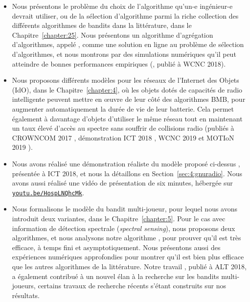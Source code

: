 \begin{resume_fr}
\begin{itemize}
    \item
    Nous présentons le problème du choix de l'algorithme qu'un-e ingénieur-e devrait utiliser, ou de la sélection d'algorithme parmi la riche collection des différents algorithmes de bandits dans la littérature, dans le Chapitre~\ref{chapter:25}.
    Nous présentons un algorithme d'agrégation d'algorithmes, appelé \Aggr, comme une solution en ligne au problème de sélection d'algorithmes, et nous montrons par des simulations numériques qu'il peut atteindre de bonnes performances empiriques
    (\cite{Besson2018WCNC}, publié à WCNC 2018).

    \item
    Nous proposons différents modèles pour les réseaux de l'Internet des Objets (IdO), dans le Chapitre~\ref{chapter:4}, où les objets dotés de capacités de radio intelligente peuvent mettre en œuvre de leur côté des algorithmes BMB, pour augmenter automatiquement la durée de vie de leur batterie.
    Cela permet également à davantage d'objets d'utiliser le même réseau tout en maintenant un taux élevé d'accès au spectre sans souffrir de collisions radio
    (publiés à CROWNCOM 2017 \cite{Bonnefoi17}, démonstration ICT 2018 \cite{Besson2018ICT}, WCNC 2019 \cite{Besson2019WCNC} et MOTIoN 2019 \cite{Bonnefoi2019WCNC}).

    \item
    Nous avons réalisé une démonstration réaliste du modèle proposé ci-dessus \cite{Besson2018ICT,Besson2019WCNC}, présentée à ICT 2018, et nous la détaillons en Section~\ref{sec:4:gnuradio}. Nous avons aussi réalisé une vidéo de présentation de six minutes, hébergée sur \texttt{\href{https://youtu.be/HospLNQhcMk}{youtu.be/HospLNQhcMk}}.


    \item
    Nous formalisons le modèle du bandit multi-joueur, pour lequel nous avons introduit deux variantes, dans le Chapitre~\ref{chapter:5}.
    Pour le cas avec information de détection spectrale (\emph{spectral sensing}), nous proposons deux algorithmes, et nous analysons notre algorithme \MCTopM, pour prouver qu'il est très efficace, à temps fini et asymptotiquement.
    Nous présentons aussi des expériences numériques approfondies pour montrer qu'il est bien plus efficace que les autres algorithmes de la littérature.
    Notre travail \cite{Besson2018ALT}, publié à ALT 2018, a également contribué à un nouvel élan à la recherche sur les bandits multi-joueurs, certains travaux de recherche récents s'étant construits sur nos résultats.


\end{itemize}
\end{resume_fr}
